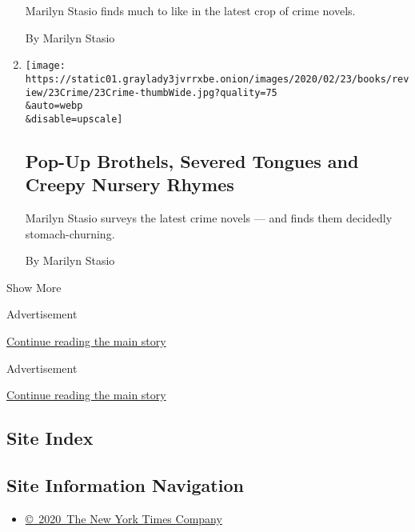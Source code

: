 \begin{enumerate}
  Marilyn Stasio finds much to like in the latest crop of crime novels.

  By Marilyn Stasio
\item
  \href{/2020/02/20/books/review/crime-fiction-stasio.html}{}

  \texttt{[image: https://static01.graylady3jvrrxbe.onion/images/2020/02/23/books/review/23Crime/23Crime-thumbWide.jpg?quality=75\\\&auto=webp\\\&disable=upscale]}

  \hypertarget{pop-up-brothels-severed-tongues-and-creepy-nursery-rhymes}{%
  \subsection{Pop-Up Brothels, Severed Tongues and Creepy Nursery
  Rhymes}\label{pop-up-brothels-severed-tongues-and-creepy-nursery-rhymes}}

  Marilyn Stasio surveys the latest crime novels --- and finds them
  decidedly stomach-churning.

  By Marilyn Stasio
\end{enumerate}

Show More

Advertisement

\protect\hyperlink{after-mid1}{Continue reading the main story}

Advertisement

\protect\hyperlink{after-mktg}{Continue reading the main story}

\hypertarget{site-index}{%
\subsection{Site Index}\label{site-index}}

\hypertarget{site-information-navigation}{%
\subsection{Site Information
Navigation}\label{site-information-navigation}}

\begin{itemize}
\tightlist
\item
  \href{https://help.nytimes3xbfgragh.onion/hc/en-us/articles/115014792127-Copyright-notice}{©~2020~The
  New York Times Company}
\end{itemize}

